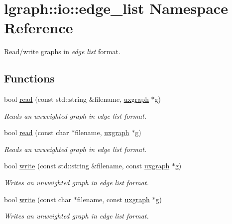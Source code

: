 \hypertarget{namespacelgraph_1_1io_1_1edge__list}{}\section{lgraph\+:\+:io\+:\+:edge\+\_\+list Namespace Reference}
\label{namespacelgraph_1_1io_1_1edge__list}


Read/write graphs in {\itshape edge} {\itshape list} format.  


\subsection*{Functions}
\begin{DoxyCompactItemize}
\item 
bool \hyperlink{namespacelgraph_1_1io_1_1edge__list_a51d3431a6910ab3120f2d12efb7c2073}{read} (const std\+::string \&filename, \hyperlink{classlgraph_1_1uxgraph}{uxgraph} $\ast$g)
\begin{DoxyCompactList}\small\item\em Reads an unweighted graph in edge list format. \end{DoxyCompactList}\item 
bool \hyperlink{namespacelgraph_1_1io_1_1edge__list_a1861bd84b7b67c310fd1b13534b7308b}{read} (const char $\ast$filename, \hyperlink{classlgraph_1_1uxgraph}{uxgraph} $\ast$g)
\begin{DoxyCompactList}\small\item\em Reads an unweighted graph in edge list format. \end{DoxyCompactList}\item 
bool \hyperlink{namespacelgraph_1_1io_1_1edge__list_a769bbfbae588e800a54d5920ebf6f4d0}{write} (const std\+::string \&filename, const \hyperlink{classlgraph_1_1uxgraph}{uxgraph} $\ast$g)
\begin{DoxyCompactList}\small\item\em Writes an unweighted graph in edge list format. \end{DoxyCompactList}\item 
bool \hyperlink{namespacelgraph_1_1io_1_1edge__list_aed1aa537146bbb2f4f2308a04ec12ff6}{write} (const char $\ast$filename, const \hyperlink{classlgraph_1_1uxgraph}{uxgraph} $\ast$g)
\begin{DoxyCompactList}\small\item\em Writes an unweighted graph in edge list format. \end{DoxyCompactList}\item 

\end{DoxyCompactItemize}
